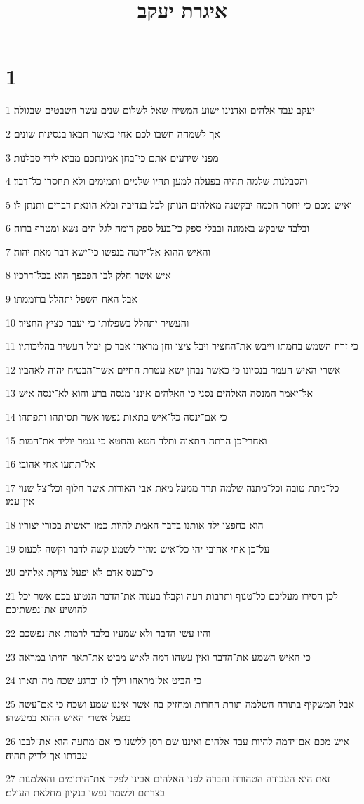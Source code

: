 

\title{איגרת יעקב}


\chapter{1}

\par 1 יעקב עבד אלהים ואדנינו ישוע המשיח שאל לשלום שנים עשר השבטים שבגולה׃
\par 2 אך לשמחה חשבו לכם אחי כאשר תבאו בנסינות שונים׃
\par 3 מפני שידעים אתם כי־בחן אמונתכם מביא לידי סבלנות׃
\par 4 והסבלנות שלמה תהיה בפעלה למען תהיו שלמים ותמימים ולא תחסרו כל־דבר׃
\par 5 ואיש מכם כי יחסר חכמה יבקשנה מאלהים הנותן לכל בנדיבה ובלא הונאת דברים ותנתן לו׃
\par 6 ובלבד שיבקש באמונה ובבלי ספק כי־בעל ספק דומה לגל הים נשא ומטרף ברוח׃
\par 7 והאיש ההוא אל־ידמה בנפשו כי־ישא דבר מאת יהוה׃
\par 8 איש אשר חלק לבו הפכפך הוא בכל־דרכיו׃
\par 9 אבל האח השפל יתהלל ברוממתו׃
\par 10 והעשיר יתהלל בשפלותו כי יעבר כציץ החציר׃
\par 11 כי זרח השמש בחמתו וייבש את־החציר ויבל ציצו וחן מראהו אבד כן יבול העשיר בהליכותיו׃
\par 12 אשרי האיש העמד בנסיונו כי כאשר נבחן ישא עטרת החיים אשר־הבטיח יהוה לאהביו׃
\par 13 אל־יאמר המנסה האלהים נסני כי האלהים איננו מנסה ברע והוא לא־ינסה איש׃
\par 14 כי אם־ינסה כל־איש בתאות נפשו אשר תסיתהו ותפתהו׃
\par 15 ואחרי־כן הרתה התאוה ותלד חטא והחטא כי נגמר יוליד את־המות׃
\par 16 אל־תתעו אחי אהובי׃
\par 17 כל־מתת טובה וכל־מתנה שלמה תרד ממעל מאת אבי האורות אשר חלוף וכל־צל שנוי אין־עמו׃
\par 18 הוא בחפצו ילד אותנו בדבר האמת להיות כמו ראשית בכורי יצוריו׃
\par 19 על־כן אחי אהובי יהי כל־איש מהיר לשמע קשה לדבר וקשה לכעוס׃
\par 20 כי־כעס אדם לא יפעל צדקת אלהים׃
\par 21 לכן הסירו מעליכם כל־טנוף ותרבות רעה וקבלו בענוה את־הדבר הנטוע בכם אשר יכל להושיע את־נפשתיכם׃
\par 22 והיו עשי הדבר ולא שמעיו בלבד לרמות את־נפשכם׃
\par 23 כי האיש השמע את־הדבר ואין עשהו דמה לאיש מביט את־תאר הויתו במראה׃
\par 24 כי הביט אל־מראהו וילך לו וברגע שכח מה־תארו׃
\par 25 אבל המשקיף בתורה השלמה תורת החרות ומחזיק בה אשר איננו שמע ושכח כי אם־עשה בפעל אשרי האיש ההוא במעשהו׃
\par 26 איש מכם אם־ידמה להיות עבד אלהים ואיננו שם רסן ללשנו כי אם־מתעה הוא את־לבבו עבדתו אך־לריק תהיה׃
\par 27 זאת היא העבודה הטהורה והברה לפני האלהים אבינו לפקד את־היתומים והאלמנות בצרתם ולשמר נפשו בנקיון מחלאת העולם׃

